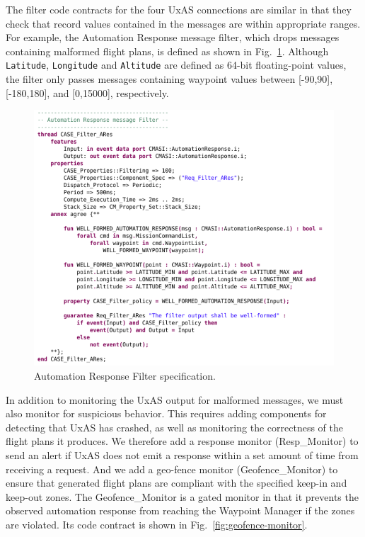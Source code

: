 \documentclass[global,twocolumn]{svjour}
\newcommand{\figref}[1]{Fig.~\ref{#1}}
\begin{document}
The filter code contracts for the four UxAS connections are similar in that they check that record values contained in the messages are within appropriate ranges.
%
For example, the Automation Response message filter, which drops messages containing malformed flight plans, is defined as shown in \figref{fig:automation-response-filter}.
%
Although \texttt{Latitude}, \texttt{Longitude} and \texttt{Altitude} are defined as 64-bit floating-point values, the filter only passes messages containing waypoint values between [-90,90], [-180,180], and [0,15000], respectively.

\begin{figure}[h]
	\centering
	\includegraphics[width=1\columnwidth]{figs/automation-response-filter.png}
	\caption{Automation Response Filter specification.}
	\label{fig:automation-response-filter}
\end{figure}

In addition to monitoring the UxAS output for malformed messages, we must also monitor for suspicious behavior.
%
This requires adding components for detecting that UxAS has crashed, as well as monitoring the correctness of the flight plans it produces.
%
We therefore add a response monitor (Resp\_Monitor) to send an alert if UxAS does not emit a response within a set amount of time from receiving a request.
%
And we add a geo-fence monitor (Geofence\_Monitor) to ensure that generated flight plans are compliant with the specified keep-in and keep-out zones.
%
The Geofence\_Monitor is a gated monitor in that it prevents the observed automation response from reaching the Waypoint Manager if the zones are violated.
%
Its code contract is shown in \figref{fig:geofence-monitor}.
\end{document}
